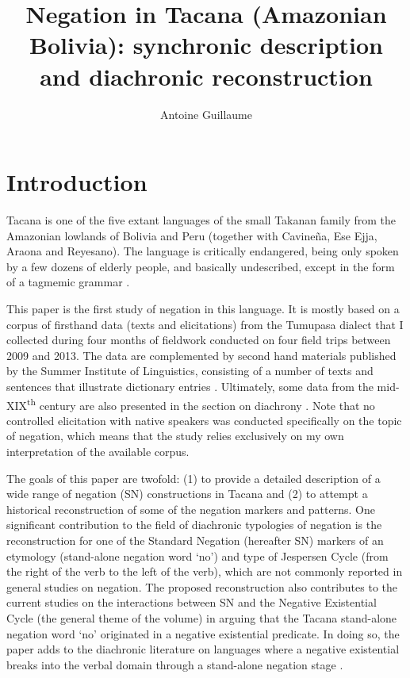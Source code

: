 \documentclass[output=paper]{langsci/langscibook}
\author{Antoine Guillaume\affiliation{}}
\title{Negation in Tacana (Amazonian Bolivia): synchronic description and
diachronic reconstruction}
\begin{document}
\section{Introduction}  

Tacana is one of the five extant languages of the small Takanan family from
the Amazonian lowlands of Bolivia and Peru (together with Cavineña, Ese
Ejja, Araona and Reyesano). The language is critically endangered, being
only spoken by a few dozens of elderly people, and basically undescribed,
except in the form of a tagmemic grammar \parencites{Ottaviano1965}{Ottaviano1967}.

This paper is the first study of negation in this language. It is mostly
based on a corpus of firsthand data (texts and elicitations) from the Tumupasa
dialect that I collected during four months of fieldwork conducted on
four field trips between 2009 and 2013. The data are complemented by second
hand materials published by the Summer Institute of Linguistics, consisting
of a number of texts \citep{Ottaviano1980} and sentences that illustrate
dictionary entries \parencite{Ottaviano1989}. Ultimately,
some data from the mid-XIX\textsuperscript{th} century are also presented
in the section on diachrony \parencite{LafoneQuevedo1902}. Note that no
controlled elicitation with native speakers was conducted specifically on
the topic of negation, which means that the study relies exclusively on my
own interpretation of the available corpus.

The goals of this paper are twofold: (1) to provide a detailed
description of a wide range of negation (SN) constructions in Tacana and
(2) to attempt a historical reconstruction of some of the negation
markers and patterns. One significant contribution to the field of
diachronic typologies of negation is the reconstruction for one of the
Standard Negation (hereafter SN) markers of an etymology (stand-alone
negation word `no') and type of Jespersen Cycle (from the right of the verb
to the left of the verb), which are not commonly reported in general
studies on negation.  The proposed reconstruction also contributes to the
current studies on the interactions between SN and the Negative Existential
Cycle (the general theme of the volume) in arguing that the Tacana
stand-alone negation word `no' originated in a negative existential
predicate. In doing so, the paper adds to the diachronic literature on
languages where a negative existential breaks into the verbal domain
through a stand-alone negation stage
\parencites[10, 13--14]{Croft1991}[127ff]{Veselinova2013-tac}[155--156]{Veselinova2016}.
\end{document}

